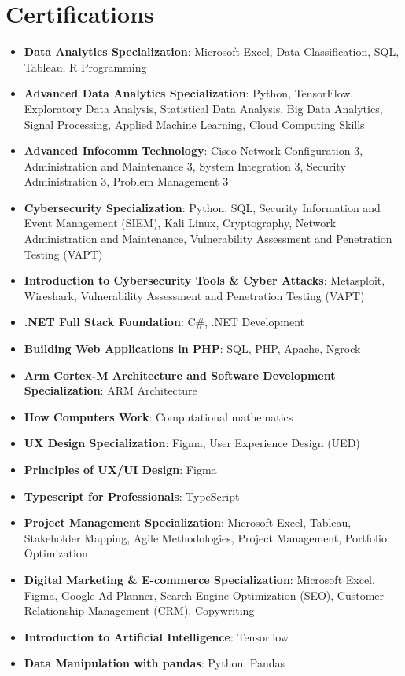 \documentclass[letterpaper,11pt]{article}
\newcommand{\resumeItem}[2]{
  \item\small{
    \textbf{#1}{: #2 \vspace{-2pt}}
  }
}
\newcommand{\resumeSubItem}[2]{\resumeItem{#1}{#2}\vspace{-4pt}}
\newcommand{\resumeSubHeadingListStart}{\begin{itemize}[leftmargin=*]}
\newcommand{\resumeSubHeadingListEnd}{\end{itemize}}
\begin{document}
\section{Certifications}
 \resumeSubHeadingListStart
    \resumeSubItem{Data Analytics Specialization}
        {Microsoft Excel, Data Classification, SQL, Tableau, R Programming}
    \resumeSubItem{Advanced Data Analytics Specialization}
        {Python, TensorFlow, Exploratory Data Analysis, Statistical Data Analysis, Big Data Analytics, Signal Processing, Applied Machine Learning, Cloud Computing Skills}
    \resumeSubItem{Advanced Infocomm Technology}
        {Cisco Network Configuration 3, Administration and Maintenance 3, System Integration 3, Security Administration 3, Problem Management 3}
    \resumeSubItem{Cybersecurity Specialization}
        {Python, SQL, Security Information and Event Management (SIEM), Kali Linux, Cryptography, Network Administration and Maintenance, Vulnerability Assessment and Penetration Testing (VAPT)} 
    \resumeSubItem{Introduction to Cybersecurity Tools \& Cyber Attacks}
        {Metasploit, Wireshark, Vulnerability Assessment and Penetration Testing (VAPT)}
    \resumeSubItem{.NET Full Stack Foundation}
        {C\#, .NET Development}
    \resumeSubItem{Building Web Applications in PHP}
        {SQL, PHP, Apache, Ngrock}
    \resumeSubItem{Arm Cortex-M Architecture and Software Development Specialization}
        {ARM Architecture}
    \resumeSubItem{How Computers Work}
        {Computational mathematics}
    \resumeSubItem{UX Design Specialization}
        {Figma, User Experience Design (UED)}
    \resumeSubItem{Principles of UX/UI Design}
        {Figma}
    \resumeSubItem{Typescript for Professionals}
        {TypeScript}
    \resumeSubItem{Project Management Specialization}
        {Microsoft Excel, Tableau, Stakeholder Mapping, Agile Methodologies, Project Management, Portfolio Optimization}
    \resumeSubItem{Digital Marketing \& E-commerce Specialization}
        {Microsoft Excel, Figma, Google Ad Planner, Search Engine Optimization (SEO), Customer Relationship Management (CRM), Copywriting}      
    \resumeSubItem{Introduction to Artificial Intelligence}
        {Tensorflow}
    \resumeSubItem{Data Manipulation with pandas}
        {Python, Pandas}
 \resumeSubHeadingListEnd
 
\end{document}
